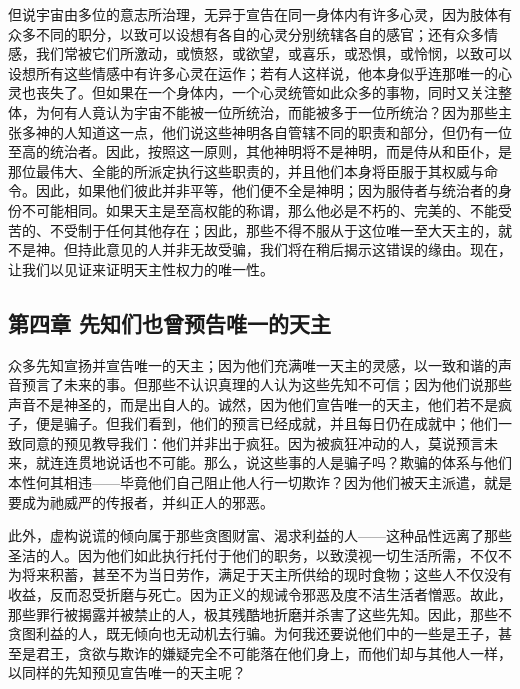 但说宇宙由多位的意志所治理，无异于宣告在同一身体内有许多心灵，因为肢体有众多不同的职分，以致可以设想有各自的心灵分别统辖各自的感官；还有众多情感，我们常被它们所激动，或愤怒，或欲望，或喜乐，或恐惧，或怜悯，以致可以设想所有这些情感中有许多心灵在运作；若有人这样说，他本身似乎连那唯一的心灵也丧失了。但如果在一个身体内，一个心灵统管如此众多的事物，同时又关注整体，为何有人竟认为宇宙不能被一位所统治，而能被多于一位所统治？因为那些主张多神的人知道这一点，他们说这些神明各自管辖不同的职责和部分，但仍有一位至高的统治者。因此，按照这一原则，其他神明将不是神明，而是侍从和臣仆，是那位最伟大、全能的所派定执行这些职责的，并且他们本身将臣服于其权威与命令。因此，如果他们彼此并非平等，他们便不全是神明；因为服侍者与统治者的身份不可能相同。如果天主是至高权能的称谓，那么他必是不朽的、完美的、不能受苦的、不受制于任何其他存在；因此，那些不得不服从于这位唯一至大天主的，就不是神。但持此意见的人并非无故受骗，我们将在稍后揭示这错误的缘由。现在，让我们以见证来证明天主性权力的唯一性。\par


\subsection{第四章  先知们也曾预告唯一的天主}

众多先知宣扬并宣告唯一的天主；因为他们充满唯一天主的灵感，以一致和谐的声音预言了未来的事。但那些不认识真理的人认为这些先知不可信；因为他们说那些声音不是神圣的，而是出自人的。诚然，因为他们宣告唯一的天主，他们若不是疯子，便是骗子。但我们看到，他们的预言已经成就，并且每日仍在成就中；他们一致同意的预见教导我们：他们并非出于疯狂。因为被疯狂冲动的人，莫说预言未来，就连连贯地说话也不可能。那么，说这些事的人是骗子吗？欺骗的体系与他们本性何其相违——毕竟他们自己阻止他人行一切欺诈？因为他们被天主派遣，就是要成为祂威严的传报者，并纠正人的邪恶。\par

此外，虚构说谎的倾向属于那些贪图财富、渴求利益的人——这种品性远离了那些圣洁的人。因为他们如此执行托付于他们的职务，以致漠视一切生活所需，不仅不为将来积蓄，甚至不为当日劳作，满足于天主所供给的现时食物；这些人不仅没有收益，反而忍受折磨与死亡。因为正义的规诫令邪恶及度不洁生活者憎恶。故此，那些罪行被揭露并被禁止的人，极其残酷地折磨并杀害了这些先知。因此，那些不贪图利益的人，既无倾向也无动机去行骗。为何我还要说他们中的一些是王子，甚至是君王，贪欲与欺诈的嫌疑完全不可能落在他们身上，而他们却与其他人一样，以同样的先知预见宣告唯一的天主呢？\par

